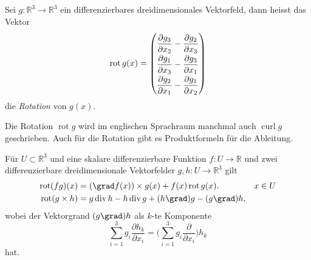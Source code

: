 \begin{definition}[Rotation]
Sei $g\colon\mathbb{R}^3\to\mathbb{R}^3$ ein differenzierbares
dreidimensionales Vektorfeld, dann heisst das Vektor
\[
\operatorname{rot}g(x)
=
{\renewcommand{\arraystretch}{1.9}
\begin{pmatrix}
\displaystyle
\frac{\partial g_3}{\partial x_2}
-
\frac{\partial g_2}{\partial x_3}
\\
\displaystyle
\frac{\partial g_1}{\partial x_3}
-
\frac{\partial g_3}{\partial x_1}
\\
\displaystyle
\frac{\partial g_2}{\partial x_1}
-
\frac{\partial g_1}{\partial x_2}
\end{pmatrix}}
\]
die {\em Rotation} von $g(x)$.
\end{definition}

Die Rotation $\operatorname{rot}g$ wird im englischen Sprachraum manchmal
auch $\operatorname{curl}g$ geschrieben.
Auch für die Rotation gibt es Produktformeln für die Ableitung.

\begin{satz}
\label{buch:felder:fundamentallemma:satz:rotprodukt}
Für $U\subset\mathbb{R}^3$ und eine skalare differenzierbare Funktion
$f\colon U\to\mathbb{R}$ und zwei differenzierbare dreidimensionale
Vektorfelder $g,h\colon U\to\mathbb{R}^3$ gilt
\begin{align*}
\operatorname{rot}(fg)(x)
&=
(\grad f(x))\times g(x) + f(x)\operatorname{rot}g(x).
&&x\in U
\\
\operatorname{rot}(g\times h)
&=
g\operatorname{div}h
-
h\operatorname{div}g
+
(h\grad)g
-
(g\grad)h,
\end{align*}
wobei der Vektorgrand $(g\grad)h$ als $k$-te Komponente
\[
\sum_{i=1}^3 g_i\frac{\partial h_k}{\partial x_i}
=
\biggl(
\sum_{i=1}^3 g_i\frac{\partial}{\partial x_i}
\biggr)h_k
\]
hat.
\end{satz}

